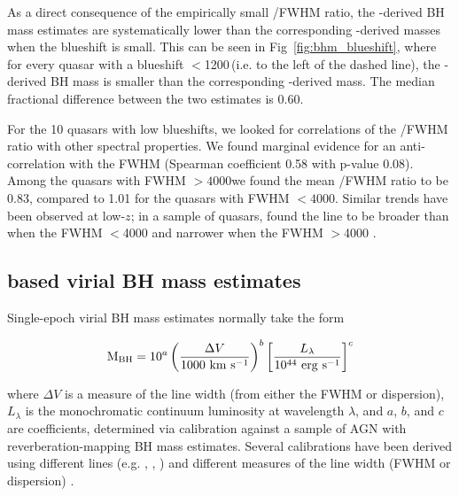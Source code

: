 As a direct consequence of the empirically small /\ha FWHM ratio, the -derived BH mass estimates are systematically lower than the corresponding \hans-derived masses when the blueshift is small.
This can be seen in Fig~\ref{fig:bhm_blueshift}, where for every quasar with a  blueshift $<$1200\,\kms (i.e. to the left of the dashed line), the -derived BH mass is smaller than the corresponding \hans-derived mass.
The median fractional difference between the two estimates is 0.60.  

For the 10 quasars with low  blueshifts, we looked for correlations of the /\ha FWHM ratio with other spectral properties.
We found marginal evidence for an anti-correlation with the \ha FWHM (Spearman coefficient 0.58 with p-value 0.08). 
Among the quasars with \ha FWHM $>4000$\kms we found the mean /\ha FWHM ratio to be 0.83, compared to 1.01 for the quasars with \ha FWHM $<4000$\kms.  
Similar trends have been observed at low-$z$; in a sample of \citet{boroson92} quasars, \citet{baskin05} found the  line to be broader than \hb when the \hb FWHM $<$4000 \kms and narrower when the \hb FWHM $>$4000 \kms. 

\subsection{ based virial BH mass estimates}

Single-epoch virial BH mass estimates normally take the form

\begin{equation}
  \label{eq:virialmass}
  {\rm M_{BH}} = 10^{a} \left( \frac{\Delta V}{1000~{\rm km~s^{-1}}} \right)^b \left[ \frac{L_{\lambda}}{10^{44}~{\rm erg~s^{-1}}} \right]^c
\end{equation}

\noindent where $\Delta V$ is a measure of the line width (from either the FWHM or dispersion), $L_\lambda$ is the monochromatic continuum luminosity at wavelength $\lambda$, and $a$, $b$, and $c$ are coefficients, determined via calibration against a sample of AGN with reverberation-mapping BH mass estimates. Several calibrations have been derived using different lines (e.g. \hbns, , ) and different measures of the line width (FWHM or dispersion) \citep[e.g.][]{vestergaard02,mclure02,vestergaard06,mcgill08,wang09,rafiee11,park13}.

